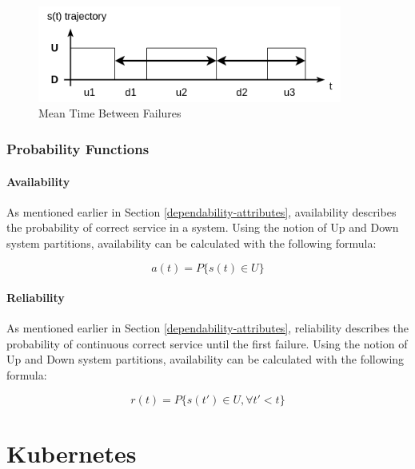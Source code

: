 \begin{figure}[h]
	\centering
	\includegraphics[width=100mm, keepaspectratio]{figures/MTBF.png}
	\caption{ Mean Time Between Failures \cite{DependabilityBMEMIT} }
	\label{fig:mtbf}
\end{figure}

\subsubsection{Probability Functions} \label{background-dep-metrics-prob-funcs}

\paragraph{Availability} As mentioned earlier in Section \ref{dependability-attributes}, availability describes the probability of correct service in a system. Using the notion of Up and Down system partitions, availability can be calculated with the following formula:

\[
a(t) = P\{ s(t) \in U \}
\]

\paragraph{Reliability} As mentioned earlier in Section \ref{dependability-attributes}, reliability describes the probability of continuous correct service until the first failure. Using the notion of Up and Down system partitions, availability can be calculated with the following formula:

\[
r(t) = P\{ s(t') \in U, \forall t' < t \}
\]


\section{Kubernetes}

